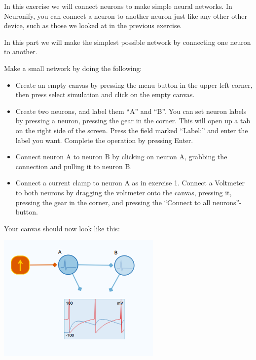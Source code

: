 \begin{Exercise}[title=Small Networks]
In this exercise we will connect neurons to make simple neural networks. In Neuronify, you can connect a neuron to another neuron just like any other other device, such as those we looked at in the previous exercise. 

\begin{ExePart}
In this part we will make the simplest possible network by connecting one neuron to another. 

Make a small network by doing the following:
\begin{itemize}
\item Create an empty canvas by pressing the menu button in the upper left corner, then press select simulation and click on the empty canvas.

\item Create two neurons, and label them ``A'' and ``B''. You can set neuron labels by pressing a neuron, pressing the gear in the \gearpos  corner. This will open up a tab on the right side of the screen. Press the field marked ``Label:'' and enter the label you want. Complete the operation by pressing Enter. 

\item Connect neuron A to neuron B by clicking on neuron A, grabbing the connection and pulling it to neuron B. 

\item Connect a current clamp to neuron A as in exercise 1. Connect a Voltmeter to both neurons by dragging the voltmeter onto the canvas, pressing it, pressing the gear in the \gearpos corner, and pressing the ``Connect to all neurons''-button.
\end{itemize}

Your canvas should now look like this: \\
\begin{center}
\includegraphics[width=8cm]{two_neurons.png}
\end{center}


\end{ExePart}
\end{Exercise}
